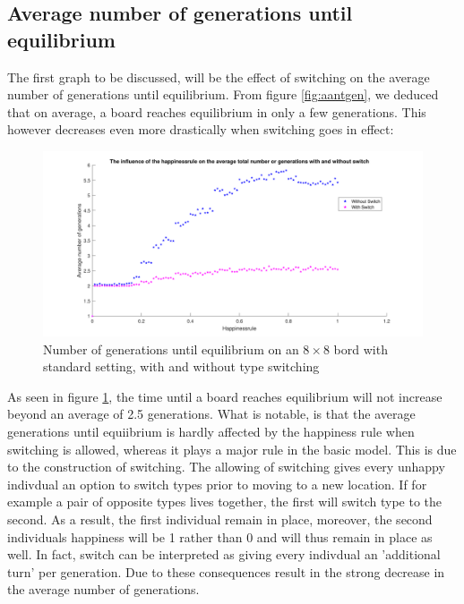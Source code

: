 \subsection{Average number of generations until equilibrium}
The first graph to be discussed, will be the effect of switching on the average number of generations until equilibrium. From figure \ref{fig:aantgen}, we deduced that on average, a board reaches equilibrium in only a few generations. This however decreases even more drastically when switching goes in effect:
\begin{figure}[H]
	\centering
    \includegraphics[width=\textwidth]{happinessrule-totaantgenwithswitchorwithoutswitch.pdf}
    \caption{Number of generations until equilibrium on an $8\times 8$ bord with standard setting, with and without type switching}
    \label{fig:AantGenS}
\end{figure}
As seen in figure \ref{fig:AantGenS}, the time until a board reaches equilibrium will not increase beyond an average of 2.5 generations. 
What is notable, is that the average generations until equiibrium is hardly affected by the happiness rule when switching is allowed, whereas it plays a major rule in the basic model. 
This is due to the construction of switching. The allowing of switching gives every unhappy indivdual an option to switch types prior to moving to a new location. 
If for example a pair of opposite types lives together, the first will switch type to the second. As a result, the first individual remain in place, moreover, the second individuals happiness will be 1 rather than 0 and will thus remain in place as well. 
In fact, switch can be interpreted as giving every indivdual an 'additional turn' per generation. Due to these consequences result in the strong decrease in the average number of generations.